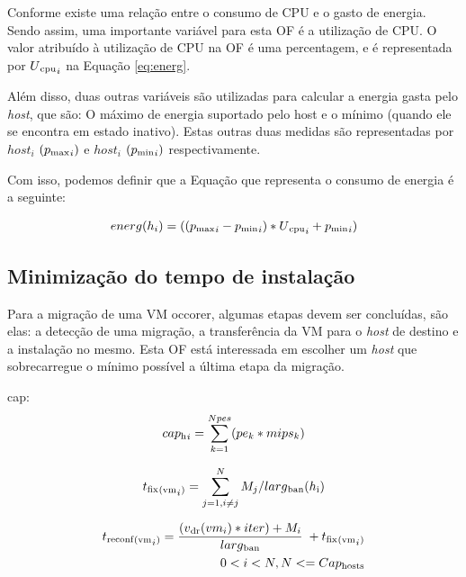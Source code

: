 Conforme \cite{beloglazov} existe uma relação entre o consumo de CPU e o gasto de energia. Sendo assim,
uma importante variável para esta OF é a utilização de CPU. O valor atribuído à utilização de CPU na OF é uma 
percentagem, e é representada por $ U\textsubscript{cpu}_i $ na Equação \ref{eq:energ}. 

Além disso, duas outras variáveis são utilizadas para calcular a energia gasta pelo \textit{host}, que são:
O máximo de energia suportado pelo host e o mínimo (quando ele se encontra em estado inativo). Estas outras duas
medidas são representadas por $ host_i $ $ (p\textsubscript{max}_i) $ e $ host_i $ $ (p\textsubscript{min}_i) $
respectivamente.

Com isso, podemos definir que a Equação que representa o consumo de energia é a seguinte:

\begin{equation}
energ(h_i ) =  ((p\textsubscript{max}_i - p\textsubscript{min}_i) * U\textsubscript{cpu}_i + p\textsubscript{min}_i) 
\label{eq:energ}
\end{equation}

\subsection{Minimização do tempo de instalação}

Para a migração de uma VM occorer, algumas etapas devem ser concluídas, são elas: 
a detecção de uma migração, a transferência da VM para o \textit{host} de destino 
e a instalação no mesmo. Esta OF está interessada em escolher um \textit{host} que 
sobrecarregue o mínimo possível a última etapa da migração. 

cap:
\begin{equation}
\begin{split}
cap\textsubscript{h}_i = \sum_{k=1}^{Npes}(pe_k * mips_k)
\end{split}
\end{equation}


\begin{equation}
t\textsubscript{fix}\textsubscript{(vm}_i\textsubscript{)} = \sum_{j=1,i \neq j}^{N} M_j/larg\textsubscript{ban}({h}\textsubscript{i})
\label{eq:tfix} 
\end{equation}

\begin{equation}
\begin{split}
t\textsubscript{reconf}\textsubscript{(vm}_i\textsubscript{)} = \dfrac{ (v\textsubscript{dr}(vm_i) * iter) + M_i}{larg\textsubscript{ban}} \; + t\textsubscript{fix}\textsubscript{(vm}_i\textsubscript{)} \\
0<i<N, N <= Cap\textsubscript{hosts}
\end{split}
\label{eq:reconf}
\end{equation}

